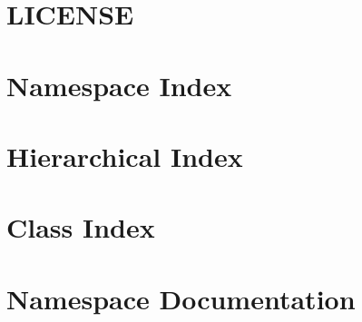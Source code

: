\let\mypdfximage\pdfximage\def\pdfximage{\immediate\mypdfximage}\documentclass[twoside]{book}
\newcommand{\+}{\discretionary{\mbox{\scriptsize$\hookleftarrow$}}{}{}}
\begin{document}
\chapter{L\+I\+C\+E\+N\+SE}
\label{md__c_1__users_slore__documents_projects_slorello89_nexmo-dotnet__l_i_c_e_n_s_e}

\chapter{Namespace Index}

\chapter{Hierarchical Index}

\chapter{Class Index}

\chapter{Namespace Documentation}





























\end{document}
